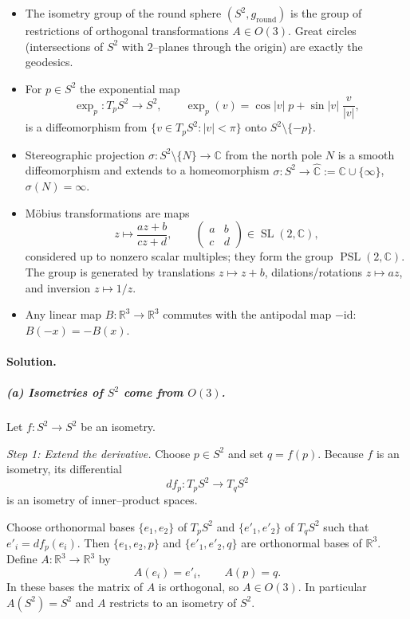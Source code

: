 \documentclass[12pt,a4paper]{article}
\theoremstyle{plain}
\theoremstyle{definition}      %
\begin{document}
	\begin{itemize}
		\item The isometry group of the round sphere $(S^{2},g_{\mathrm{round}})$ is the group of restrictions of
		orthogonal transformations $A\in O(3)$.
		Great circles (intersections of $S^{2}$ with $2$--planes through the origin) are exactly the geodesics.
		\item For $p\in S^{2}$ the exponential map
		\[
		\exp_p:T_pS^{2}\to S^{2},\qquad
		\exp_p(v)=\cos |v|\;p+\sin |v|\;\frac{v}{|v|},
		\]
		is a diffeomorphism from $\{v\in T_pS^{2}:|v|<\pi\}$ onto $S^{2}\setminus\{-p\}$.
		\item Stereographic projection $\sigma:S^{2}\setminus\{N\}\to\mathbb{C}$ from the north pole $N$ is a smooth diffeomorphism
		and extends to a homeomorphism $\sigma:S^{2}\to\hat{\mathbb{C}}:=\mathbb{C}\cup\{\infty\}$, $\sigma(N)=\infty$.
		\item M\"obius transformations are maps
		\[
		z\longmapsto \frac{az+b}{cz+d},\qquad
		\begin{pmatrix}a&b\\c&d\end{pmatrix}\in\operatorname{SL}(2,\mathbb{C}),
		\]
		considered up to nonzero scalar multiples; they form the group $\operatorname{PSL}(2,\mathbb{C})$.
		The group is generated by translations $z\mapsto z+b$, dilations/rotations $z\mapsto az$, and inversion $z\mapsto 1/z$.
		\item Any linear map $B:\mathbb{R}^{3}\to\mathbb{R}^{3}$ commutes with the antipodal map $-\mathrm{id}$:
		$B(-x)=-B(x)$.
	\end{itemize}
	
	\paragraph{Solution.}
	
	\subparagraph{(a) Isometries of $S^{2}$ come from $O(3)$.}
	
	Let $f:S^{2}\to S^{2}$ be an isometry.
	
	\emph{Step 1: Extend the derivative.}
	Choose $p\in S^{2}$ and set $q=f(p)$.  
	Because $f$ is an isometry, its differential
	\[
	df_p:T_pS^{2}\to T_qS^{2}
	\]
	is an isometry of inner--product spaces.
	
	Choose orthonormal bases $\{e_1,e_2\}$ of $T_pS^{2}$ and $\{e'_1,e'_2\}$ of $T_qS^{2}$ such that
	$e'_i=df_p(e_i)$. Then $\{e_1,e_2,p\}$ and $\{e'_1,e'_2,q\}$ are orthonormal bases of $\mathbb{R}^{3}$.
	Define $A:\mathbb{R}^{3}\to\mathbb{R}^{3}$ by
	\[
	A(e_i)=e'_i,\qquad A(p)=q.
	\]
	In these bases the matrix of $A$ is orthogonal, so $A\in O(3)$.
	In particular $A(S^{2})=S^{2}$ and $A$ restricts to an isometry of $S^{2}$.
	
\end{document}
